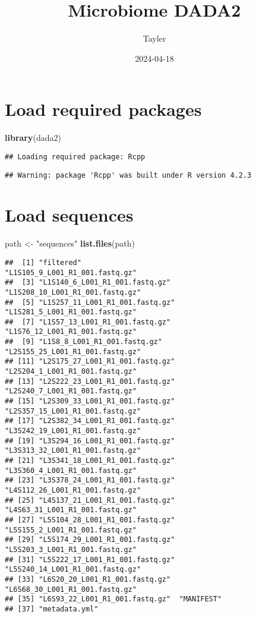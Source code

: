 \documentclass[
]{article}
\title{Microbiome DADA2}
\author{Tayler}
\date{2024-04-18}
\newenvironment{Shaded}{\begin{snugshade}}{\end{snugshade}}
\newcommand{\FunctionTok}[1]{\textcolor[rgb]{0.13,0.29,0.53}{\textbf{#1}}}
\newcommand{\NormalTok}[1]{#1}
\newcommand{\OtherTok}[1]{\textcolor[rgb]{0.56,0.35,0.01}{#1}}
\newcommand{\StringTok}[1]{\textcolor[rgb]{0.31,0.60,0.02}{#1}}
\begin{document}
\maketitle

\hypertarget{load-required-packages}{%
\section{Load required packages}\label{load-required-packages}}

\begin{Shaded}
\begin{Highlighting}[]
\FunctionTok{library}\NormalTok{(dada2)}
\end{Highlighting}
\end{Shaded}

\begin{verbatim}
## Loading required package: Rcpp
\end{verbatim}

\begin{verbatim}
## Warning: package 'Rcpp' was built under R version 4.2.3
\end{verbatim}

\hypertarget{load-sequences}{%
\section{Load sequences}\label{load-sequences}}

\begin{Shaded}
\begin{Highlighting}[]
\NormalTok{path }\OtherTok{\textless{}{-}} \StringTok{"sequences"}
\FunctionTok{list.files}\NormalTok{(path)}
\end{Highlighting}
\end{Shaded}

\begin{verbatim}
##  [1] "filtered"                       "L1S105_9_L001_R1_001.fastq.gz" 
##  [3] "L1S140_6_L001_R1_001.fastq.gz"  "L1S208_10_L001_R1_001.fastq.gz"
##  [5] "L1S257_11_L001_R1_001.fastq.gz" "L1S281_5_L001_R1_001.fastq.gz" 
##  [7] "L1S57_13_L001_R1_001.fastq.gz"  "L1S76_12_L001_R1_001.fastq.gz" 
##  [9] "L1S8_8_L001_R1_001.fastq.gz"    "L2S155_25_L001_R1_001.fastq.gz"
## [11] "L2S175_27_L001_R1_001.fastq.gz" "L2S204_1_L001_R1_001.fastq.gz" 
## [13] "L2S222_23_L001_R1_001.fastq.gz" "L2S240_7_L001_R1_001.fastq.gz" 
## [15] "L2S309_33_L001_R1_001.fastq.gz" "L2S357_15_L001_R1_001.fastq.gz"
## [17] "L2S382_34_L001_R1_001.fastq.gz" "L3S242_19_L001_R1_001.fastq.gz"
## [19] "L3S294_16_L001_R1_001.fastq.gz" "L3S313_32_L001_R1_001.fastq.gz"
## [21] "L3S341_18_L001_R1_001.fastq.gz" "L3S360_4_L001_R1_001.fastq.gz" 
## [23] "L3S378_24_L001_R1_001.fastq.gz" "L4S112_26_L001_R1_001.fastq.gz"
## [25] "L4S137_21_L001_R1_001.fastq.gz" "L4S63_31_L001_R1_001.fastq.gz" 
## [27] "L5S104_28_L001_R1_001.fastq.gz" "L5S155_2_L001_R1_001.fastq.gz" 
## [29] "L5S174_29_L001_R1_001.fastq.gz" "L5S203_3_L001_R1_001.fastq.gz" 
## [31] "L5S222_17_L001_R1_001.fastq.gz" "L5S240_14_L001_R1_001.fastq.gz"
## [33] "L6S20_20_L001_R1_001.fastq.gz"  "L6S68_30_L001_R1_001.fastq.gz" 
## [35] "L6S93_22_L001_R1_001.fastq.gz"  "MANIFEST"                      
## [37] "metadata.yml"
\end{verbatim}
\end{document}
